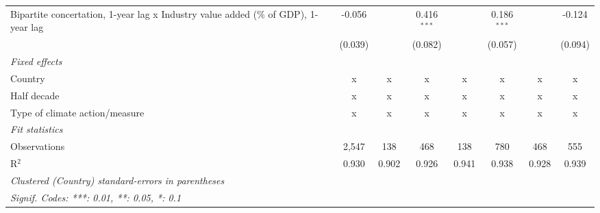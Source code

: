 \begin{table}[htbp]
\begin{tabular}{lccccccc}
      Bipartite concertation, 1-year lag x Industry value added (\% of GDP), 1-year lag  & -0.056        &                           & 0.416$^{***}$   &                  & 0.186$^{***}$   &                 & -0.124\\   
                                                                                         & (0.039)       &                           & (0.082)         &                  & (0.057)         &                 & (0.094)\\   
      \emph{Fixed effects}\\
      Country                                                                            & x             & x                         & x               & x                & x               & x               & x\\  
      Half decade                                                                        & x             & x                         & x               & x                & x               & x               & x\\  
      Type of climate action/measure                                                     & x             & x                         & x               & x                & x               & x               & x\\  
      \midrule \emph{Fit statistics}\\
      Observations                                                                       & 2,547         & 138                       & 468             & 138              & 780             & 468             & 555\\  
      R$^2$                                                                              & 0.930         & 0.902                     & 0.926           & 0.941            & 0.938           & 0.928           & 0.939\\  
      \midrule
      \multicolumn{8}{l}{\emph{Clustered (Country) standard-errors in parentheses}}\\
      \multicolumn{8}{l}{\emph{Signif. Codes: ***: 0.01, **: 0.05, *: 0.1}}\\
   \end{tabular}
\end{table}


